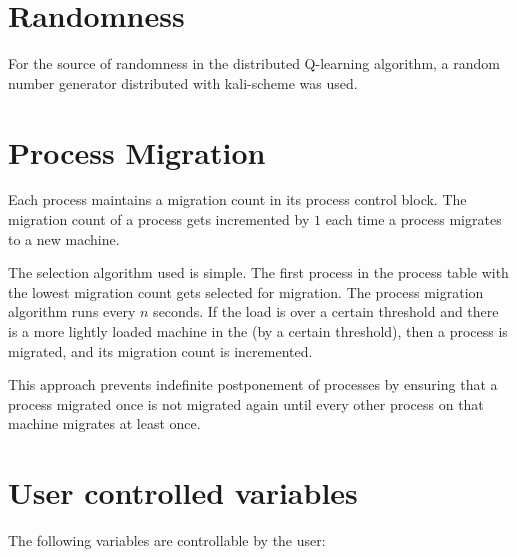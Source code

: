 \documentclass{report}
\begin{document}
\section{Randomness}

For the source of randomness in the distributed Q-learning algorithm, a
random number generator distributed with kali-scheme was used.


\section{Process Migration}

Each process maintains a migration count in its process control block.  The
migration count of a process gets incremented by $1$ each time a process
migrates to a new machine.

The selection algorithm used is simple.  The first process in the process
table with the lowest migration count gets selected for migration.  The
process migration algorithm runs every $n$ seconds.  If the load is over a
certain threshold and there is a more lightly loaded machine in the (by a
certain threshold), then a process is migrated, and its migration count is
incremented. 

This approach prevents indefinite postponement of processes by ensuring that
a process migrated once is not migrated again until every other process on
that machine migrates at least once.

\section{User controlled variables}
\label{user-config}

The following variables are controllable by the user:
\end{document}
